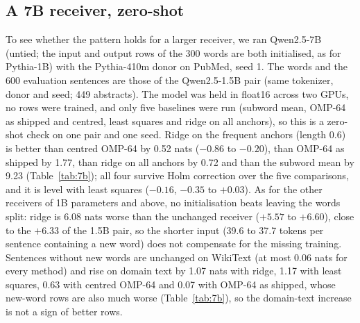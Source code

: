 \documentclass[preprint,12pt]{elsarticle}
\begin{document}
\subsection{A 7B receiver, zero-shot}
\label{sec:7b}
To see whether the pattern holds for a larger receiver, we ran Qwen2.5-7B (untied; the input and output rows of the 300 words are both initialised, as for Pythia-1B) with the Pythia-410m donor on PubMed, seed 1. The words and the 600 evaluation sentences are those of the Qwen2.5-1.5B pair (same tokenizer, donor and seed; 449 abstracts). The model was held in float16 across two GPUs, no rows were trained, and only five baselines were run (subword mean, OMP-64 as shipped and centred, least squares and ridge on all anchors), so this is a zero-shot check on one pair and one seed. Ridge on the frequent anchors (length 0.6) is better than centred OMP-64 by 0.52 nats ($-0.86$ to $-0.20$), than OMP-64 as shipped by 1.77, than ridge on all anchors by 0.72 and than the subword mean by 9.23 (Table~\ref{tab:7b}); all four survive Holm correction over the five comparisons, and it is level with least squares ($-0.16$, $-0.35$ to $+0.03$). As for the other receivers of 1B parameters and above, no initialisation beats leaving the words split: ridge is 6.08 nats worse than the unchanged receiver ($+5.57$ to $+6.60$), close to the $+6.33$ of the 1.5B pair, so the shorter input (39.6 to 37.7 tokens per sentence containing a new word) does not compensate for the missing training. Sentences without new words are unchanged on WikiText (at most 0.06 nats for every method) and rise on domain text by 1.07 nats with ridge, 1.17 with least squares, 0.63 with centred OMP-64 and 0.07 with OMP-64 as shipped, whose new-word rows are also much worse (Table~\ref{tab:7b}), so the domain-text increase is not a sign of better rows.
\begin{table}[t]
\centering\small
\caption{Qwen2.5-7B $\leftarrow$ Pythia-410m, PubMed seed 1, zero-shot, float16 (600 sentences containing the 300 new words; nats per sentence, negative = the first method is better). $^{*}$ the 95\,\% abstract-level bootstrap interval (100\,000 resamples) excludes 0; $^{\dagger}$ significant after Holm correction over the five comparisons of the last column.}
\label{tab:7b}
\resizebox{\textwidth}{!}{}
\end{table}
\end{document}
